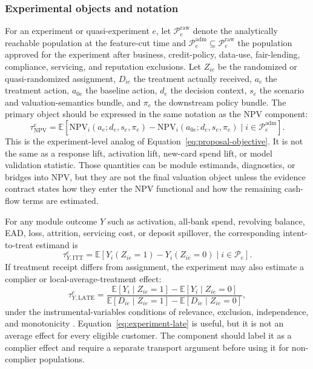 \documentclass[11pt]{article}
\newcommand{\E}{\mathbb{E}}
\newcommand{\NPV}{\mathrm{NPV}}
\newcommand{\1}{\mathbf{1}}
\begin{document}
\subsubsection{Experimental objects and notation}

For an experiment or quasi-experiment $e$, let
$\mathcal{P}^{\mathrm{raw}}_e$ denote the analytically reachable population at
the feature-cut time and $\mathcal{P}^{\mathrm{adm}}_e\subseteq
\mathcal{P}^{\mathrm{raw}}_e$ the population approved for the experiment after
business, credit-policy, data-use, fair-lending, compliance, servicing, and
reputation exclusions. Let $Z_{ie}$ be the randomized or quasi-randomized
assignment, $D_{ie}$ the treatment actually received, $a_e$ the treatment
action, $a_{0e}$ the baseline action, $d_e$ the decision context, $s_e$ the
scenario and valuation-semantics bundle, and $\pi_e$ the downstream policy
bundle. The primary object should be expressed in the same notation as the NPV
component:
\begin{equation}
  \tau^{e}_{\NPV}
  =
  \E\!\left[
    \NPV_i(a_e;d_e,s_e,\pi_e)
    -
    \NPV_i(a_{0e};d_e,s_e,\pi_e)
    \mid i\in\mathcal{P}^{\mathrm{adm}}_e
  \right].
  \label{eq:experiment-npv-estimand}
\end{equation}
This is the experiment-level analog of
Equation~\eqref{eq:proposal-objective}. It is not the same as a response lift,
activation lift, new-card spend lift, or model validation statistic. Those
quantities can be module estimands, diagnostics, or bridges into NPV, but they
are not the final valuation object unless the evidence contract states how
they enter the NPV functional and how the remaining cash-flow terms are
estimated.

For any module outcome $Y$ such as activation, all-bank spend, revolving
balance, EAD, loss, attrition, servicing cost, or deposit spillover, the
corresponding intent-to-treat estimand is
\begin{equation}
  \tau^{e}_{Y,\mathrm{ITT}}
  =
  \E[Y_i(Z_{ie}=1)-Y_i(Z_{ie}=0)\mid i\in\mathcal{P}_e].
  \label{eq:experiment-itt}
\end{equation}
If treatment receipt differs from assignment, the experiment may also estimate
a complier or local-average-treatment effect:
\begin{equation}
  \tau^{e}_{Y,\mathrm{LATE}}
  =
  \frac{\E[Y_i\mid Z_{ie}=1]-\E[Y_i\mid Z_{ie}=0]}
       {\E[D_{ie}\mid Z_{ie}=1]-\E[D_{ie}\mid Z_{ie}=0]},
  \label{eq:experiment-late}
\end{equation}
under the instrumental-variables conditions of relevance, exclusion,
independence, and monotonicity
\citep{angristimbensrubin1996iv}. Equation~\eqref{eq:experiment-late} is
useful, but it is not an average effect for every eligible customer. The
component should label it as a complier effect and require a separate
transport argument before using it for non-complier populations.
\end{document}
